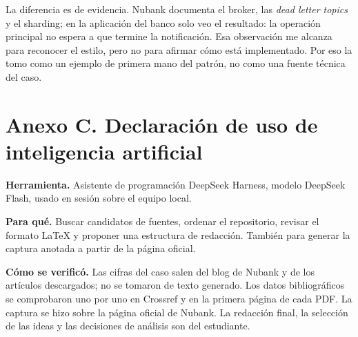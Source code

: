 \documentclass[11pt,a4paper]{article}
\begin{document}
La diferencia es de evidencia. Nubank documenta el broker, las \emph{dead letter topics} y el sharding; en la aplicación del banco solo veo el resultado: la operación principal no espera a que termine la notificación. Esa observación me alcanza para reconocer el estilo, pero no para afirmar cómo está implementado. Por eso la tomo como un ejemplo de primera mano del patrón, no como una fuente técnica del caso.

\vspace{0.9cm}
\section*{Anexo C. Declaración de uso de inteligencia artificial}

\textbf{Herramienta.} Asistente de programación DeepSeek Harness, modelo DeepSeek Flash, usado en sesión sobre el equipo local.

\textbf{Para qué.} Buscar candidatos de fuentes, ordenar el repositorio, revisar el formato LaTeX y proponer una estructura de redacción. También para generar la captura anotada a partir de la página oficial.

\textbf{Cómo se verificó.} Las cifras del caso salen del blog de Nubank y de los artículos descargados; no se tomaron de texto generado. Los datos bibliográficos se comprobaron uno por uno en Crossref y en la primera página de cada PDF. La captura se hizo sobre la página oficial de Nubank. La redacción final, la selección de las ideas y las decisiones de análisis son del estudiante.
\end{document}
